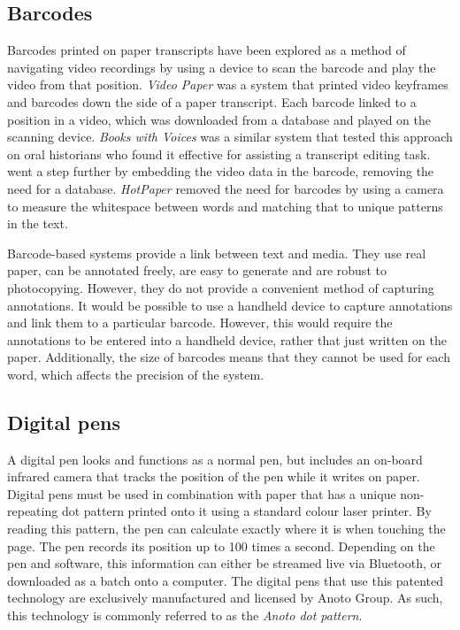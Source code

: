 \subsection{Barcodes}
Barcodes printed on paper transcripts have been explored as a method of navigating video recordings by using a device
to scan the barcode and play the video from that position. \textit{Video Paper} \citep{Hull2003} was a system that
printed video keyframes and barcodes down the side of a paper transcript. Each barcode linked to a position in a video,
which was downloaded from a database and played on the scanning device. \textit{Books with Voices} \citep{Klemmer2003}
was a similar system that tested this approach on oral historians who found it effective for assisting a transcript
editing task. \citet{Erol2007} went a step further by embedding the video data in the barcode, removing
the need for a database.  \textit{HotPaper} \citep{Erol2008} removed the need for barcodes by using a camera to measure
the whitespace between words and matching that to unique patterns in the text.

Barcode-based systems provide a link between text and media. They use real paper, can be annotated freely, are easy to
generate and are robust to photocopying.  However, they do not provide a convenient method of capturing annotations. It
would be possible to use a handheld device to capture annotations and link them to a particular barcode.  However, this
would require the annotations to be entered into a handheld device, rather that just written on the paper.
Additionally, the size of barcodes means that they cannot be used for each word, which affects the precision of the
system.

\subsection{Digital pens}

A digital pen looks and functions as a normal pen, but includes an on-board infrared camera that tracks the position of
the pen while it writes on paper. Digital pens must be used in combination with paper that has a unique non-repeating
dot pattern printed onto it using a standard colour laser printer.  By reading this pattern, the pen can calculate
exactly where it is when touching the page. The pen records its position up to 100 times a second.  Depending on the
pen and software, this information can either be streamed live via Bluetooth, or downloaded as a batch onto a computer.
The digital pens that use this patented technology \citep{Fahraeus2003} are exclusively manufactured and licensed by
Anoto Group. As such, this technology is commonly referred to as the \textit{Anoto dot pattern}.

